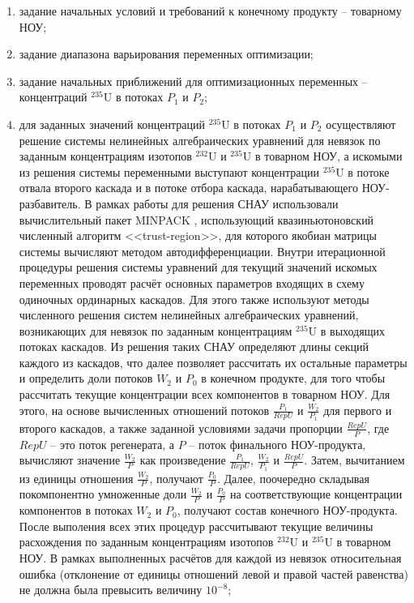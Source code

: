 \begin{enumerate}
    \item задание начальных условий и требований к конечному продукту -- товарному НОУ;
    \item задание диапазона варьирования переменных оптимизации;    
    \item задание начальных приближений для оптимизационных переменных -- концентраций $^{235}$U в потоках $P_1$ и $P_2$;
    \item для заданных значений концентраций $^{235}$U в потоках $P_1$ и $P_2$ осуществляют решение системы нелинейных алгебраических уравнений для невязок по заданным концентрациям изотопов $^{232}$U и $^{235}$U в товарном НОУ, а искомыми из решения системы переменными выступают концентрации $^{235}$U в потоке отвала второго каскада и в потоке отбора каскада, нарабатывающего НОУ-разбавитель. В рамках работы для решения СНАУ использовали вычислительный пакет MINPACK \cite{moreMINPACK}, использующий квазиньютоновский численный алгоритм <<trust-region>>, для которого якобиан матрицы системы вычисляют методом автодифференциации. Внутри итерационной процедуры решения системы уравнений для текущий значений искомых переменных проводят расчёт основных параметров входящих в схему одиночных ординарных каскадов. Для этого также используют методы численного решения систем нелинейных алгебраических уравнений, возникающих для невязок по заданным концентрациям $^{235}$U в выходящих потоках каскадов. Из решения таких СНАУ определяют длины секций каждого из каскадов, что далее позволяет рассчитать их остальные параметры и определить доли потоков $W_2$ и $P_0$ в конечном продукте, для того чтобы рассчитать текущие концентрации всех компонентов в товарном НОУ. Для этого, на основе вычисленных отношений потоков $\frac{P_{1}}{RepU}$ и $\frac{W_{2}}{P_{1}}$ для первого и второго каскадов, а также заданной условиями задачи пропорции $\frac{RepU}{P}$, где $RepU$ -- это поток регенерата, а $P$ -- поток финального НОУ-продукта, вычисляют значение $\frac{W_{2}}{P}$ как произведение $\frac{P_{1}}{RepU}$, $\frac{W_{2}}{P_{1}}$ и $\frac{RepU}{P}$. Затем, вычитанием из единицы отношения $\frac{W_{2}}{P}$, получают $\frac{P_{0}}{P}$. Далее, поочередно складывая покомпонентно умноженные доли $\frac{W_{2}}{P}$ и $\frac{P_{0}}{P}$ на соответствующие концентрации компонентов в потоках $W_2$ и $P_0$, получают состав конечного НОУ-продукта. После выполения всех этих процедур рассчитывают текущие величины расхождения по заданным концентрациям изотопов $^{232}$U и $^{235}$U в товарном НОУ. В рамках выполненных расчётов для каждой из невязок относительная ошибка (отклонение от единицы отношений левой и правой частей равенства) не должна была превысить величину $10^{-8}$;

\end{enumerate}
